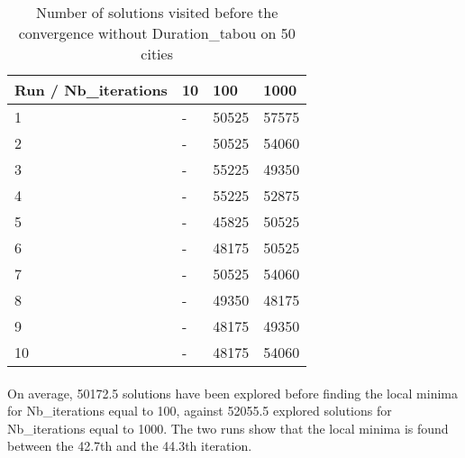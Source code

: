 \documentclass[12pt,oneside,a4paper]{article}
\begin{document}
      \begin{table}[h]
        \centering
        \small
        \begin{tabular}{llll}
          \hline
          \multicolumn{1}{|l|}{\textbf{Run / Nb\_iterations}}& \multicolumn{1}{l|}{\textbf{10}} & \multicolumn{1}{l|}{\textbf{100}} & \multicolumn{1}{l|}{\textbf{1000}}\\ \hline
          \multicolumn{1}{|l|}{1} & \multicolumn{1}{l|}{-}  & \multicolumn{1}{l|}{50525}  & \multicolumn{1}{l|}{57575}  \\ \hline
          \multicolumn{1}{|l|}{2} & \multicolumn{1}{l|}{-}  & \multicolumn{1}{l|}{50525}  & \multicolumn{1}{l|}{54060}  \\ \hline         
          \multicolumn{1}{|l|}{3} & \multicolumn{1}{l|}{-}  & \multicolumn{1}{l|}{55225}  & \multicolumn{1}{l|}{49350}  \\ \hline
          \multicolumn{1}{|l|}{4} & \multicolumn{1}{l|}{-}  & \multicolumn{1}{l|}{55225}  & \multicolumn{1}{l|}{52875}  \\ \hline
          \multicolumn{1}{|l|}{5} & \multicolumn{1}{l|}{-}  & \multicolumn{1}{l|}{45825}  & \multicolumn{1}{l|}{50525}  \\ \hline
          \multicolumn{1}{|l|}{6} & \multicolumn{1}{l|}{-}  & \multicolumn{1}{l|}{48175}  & \multicolumn{1}{l|}{50525}  \\ \hline
          \multicolumn{1}{|l|}{7} & \multicolumn{1}{l|}{-}  & \multicolumn{1}{l|}{50525}  & \multicolumn{1}{l|}{54060}  \\ \hline
          \multicolumn{1}{|l|}{8} & \multicolumn{1}{l|}{-}  & \multicolumn{1}{l|}{49350}  & \multicolumn{1}{l|}{48175}  \\ \hline
          \multicolumn{1}{|l|}{9} & \multicolumn{1}{l|}{-}  & \multicolumn{1}{l|}{48175}  & \multicolumn{1}{l|}{49350}  \\ \hline
          \multicolumn{1}{|l|}{10} & \multicolumn{1}{l|}{-}  & \multicolumn{1}{l|}{48175}  & \multicolumn{1}{l|}{54060}  \\ \hline
        \end{tabular}
        \caption{Number of solutions visited before the convergence without Duration\_tabou on 50 cities}
        \label{Performances scénario 0}
      \end{table}

\paragraph{}
    On average, 50172.5 solutions have been explored before finding the local minima for Nb\_iterations equal to 100, against 52055.5 explored solutions for Nb\_iterations equal to 1000.
    The two runs show that the local minima is found between the 42.7th and the 44.3th iteration. 
\end{document}
